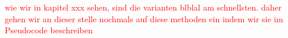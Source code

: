 

\textcolor{red}{wie wir in kapitel xxx sehen, sind die varianten blblal am schnellsten. daher gehen wir 
an dieser stelle nochmals auf diese methoden ein indem wir sie im Pseudocode beschreiben}




